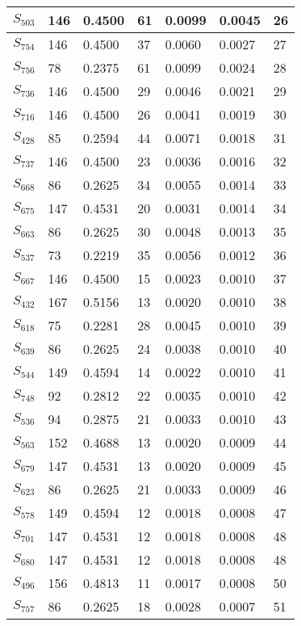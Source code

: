 \begin{xltabular}{\textwidth}{|X|X|X|X|X|X|X|}
 $S_{503}$ & 146 & 0.4500 & 61 & 0.0099 & 0.0045 & 26 \\ \hline
 $S_{754}$ & 146 & 0.4500 & 37 & 0.0060 & 0.0027 & 27 \\ \hline
 $S_{756}$ & 78 & 0.2375 & 61 & 0.0099 & 0.0024 & 28 \\ \hline
 $S_{736}$ & 146 & 0.4500 & 29 & 0.0046 & 0.0021 & 29 \\ \hline
 $S_{716}$ & 146 & 0.4500 & 26 & 0.0041 & 0.0019 & 30 \\ \hline
 $S_{428}$ & 85 & 0.2594 & 44 & 0.0071 & 0.0018 & 31 \\ \hline
 $S_{737}$ & 146 & 0.4500 & 23 & 0.0036 & 0.0016 & 32 \\ \hline
 $S_{668}$ & 86 & 0.2625 & 34 & 0.0055 & 0.0014 & 33 \\ \hline
 $S_{675}$ & 147 & 0.4531 & 20 & 0.0031 & 0.0014 & 34 \\ \hline
 $S_{663}$ & 86 & 0.2625 & 30 & 0.0048 & 0.0013 & 35 \\ \hline
 $S_{537}$ & 73 & 0.2219 & 35 & 0.0056 & 0.0012 & 36 \\ \hline
 $S_{667}$ & 146 & 0.4500 & 15 & 0.0023 & 0.0010 & 37 \\ \hline
 $S_{432}$ & 167 & 0.5156 & 13 & 0.0020 & 0.0010 & 38 \\ \hline
 $S_{618}$ & 75 & 0.2281 & 28 & 0.0045 & 0.0010 & 39 \\ \hline
 $S_{639}$ & 86 & 0.2625 & 24 & 0.0038 & 0.0010 & 40 \\ \hline
 $S_{544}$ & 149 & 0.4594 & 14 & 0.0022 & 0.0010 & 41 \\ \hline
 $S_{748}$ & 92 & 0.2812 & 22 & 0.0035 & 0.0010 & 42 \\ \hline
 $S_{536}$ & 94 & 0.2875 & 21 & 0.0033 & 0.0010 & 43 \\ \hline
 $S_{563}$ & 152 & 0.4688 & 13 & 0.0020 & 0.0009 & 44 \\ \hline
 $S_{679}$ & 147 & 0.4531 & 13 & 0.0020 & 0.0009 & 45 \\ \hline
 $S_{623}$ & 86 & 0.2625 & 21 & 0.0033 & 0.0009 & 46 \\ \hline
 $S_{578}$ & 149 & 0.4594 & 12 & 0.0018 & 0.0008 & 47 \\ \hline
 $S_{701}$ & 147 & 0.4531 & 12 & 0.0018 & 0.0008 & 48 \\ \hline
 $S_{680}$ & 147 & 0.4531 & 12 & 0.0018 & 0.0008 & 48 \\ \hline
 $S_{496}$ & 156 & 0.4813 & 11 & 0.0017 & 0.0008 & 50 \\ \hline
 $S_{757}$ & 86 & 0.2625 & 18 & 0.0028 & 0.0007 & 51 \\ \hline

\end{xltabular}
